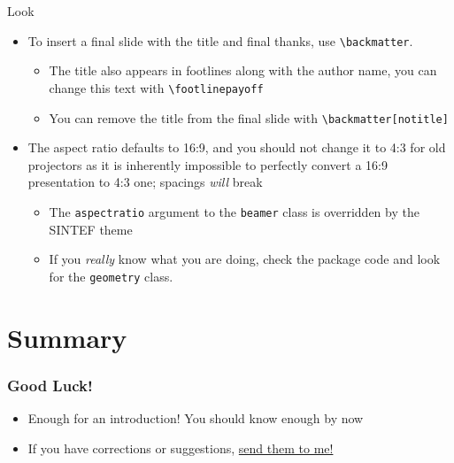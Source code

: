 \documentclass{beamer}
\newcommand{\hrefcol}[2]{\textcolor{cyan}{\href{#1}{#2}}}
\begin{document}
\begin{frame}[fragile]{Look}
    \begin{itemize}
        \item To insert a final slide with the title and final thanks, use \verb|\backmatter|.
              \begin{itemize}
                  \item The title also appears in footlines along with the author name, you can change this text with \verb|\footlinepayoff|
                  \item You can remove the title from the final slide with \verb|\backmatter[notitle]|
              \end{itemize}
        \item The aspect ratio defaults to 16:9, and you should not change it to 4:3
              for old projectors as it is inherently impossible to perfectly convert a
              16:9 presentation to 4:3 one; spacings \emph{will} break
              \begin{itemize}
                  \item The \texttt{aspectratio} argument to the \texttt{beamer} class is
                        overridden by the SINTEF theme
                  \item If you \emph{really} know what you are doing, check the package
                        code and look for the \texttt{geometry} class.
              \end{itemize}
    \end{itemize}
\end{frame}

\section{Summary}

\begin{frame}
    \frametitle{Good Luck!}
    \begin{itemize}
        \item Enough for an introduction! You should know enough by now
        \item If you have corrections or suggestions,
              \hrefcol{mailto:andrea@gasparini.cloud}{send them to me!}
    \end{itemize}
\end{frame}
\end{document}
